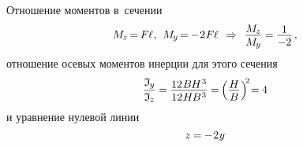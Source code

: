 \documentclass[14pt]{extarticle}
\begin{document}
Отношение моментов в~сечении
\[
M_{\hspace{-0.1ex}\scalebox{.8}{$z$}} \hspace{-.25ex}
= \hspace{-.2ex} F \hspace{-0.1ex} \ell
\hspace{.1ex} , \hspace{.4em}
M_{\hspace{-0.1ex}\scalebox{.8}{$y$}} \hspace{-.25ex}
= \hspace{-.2ex} - \hspace{.1ex} 2 \hspace{.1ex} F \hspace{-0.1ex} \ell
\hspace{.4em} \Rightarrow \hspace{.4em}
\displaystyle\frac{\raisebox{-0.12em}{$M_{\hspace{-0.1ex}\scalebox{.8}{$z$}}$}}{M_{\hspace{-0.1ex}\scalebox{.8}{$y$}}} \hspace{-.1ex}
= \hspace{-.1ex} \displaystyle\frac{\raisebox{-0.18em}{$1$}}{-2}
\hspace{.3ex} ,
\]
отношение осевых моментов инерции для этого сечения
\[
\displaystyle\frac{\mathfrak{I}_{\hspace{-0.1ex}\scalebox{.8}{$y$}}}{\mathfrak{I}_{\hspace{-0.1ex}\scalebox{.8}{$z$}}} \hspace{-.1ex}
= \hspace{-.1ex}
\displaystyle\frac{\raisebox{-0.18em}{$12 \hspace{.1ex} B \hspace{-0.1ex} H^{\hspace{.1ex}3}$}}{12 \hspace{.1ex} H \hspace{-0.15ex} B^{\hspace{.1ex}3}} \hspace{-.1ex}
= \hspace{-.25ex}
\left( \displaystyle\frac{\raisebox{-0.18em}{$H$}}{B} \hspace{.1ex} \right)^{\hspace{-.5ex}2} \hspace{-.5ex}
=\hspace{-.1ex} 4
\]
и уравнение нулевой линии
\[
z \hspace{-.1ex}=\hspace{-.1ex}
- \hspace{.1ex} 2 \hspace{.1ex} y
\]
\end{document}
